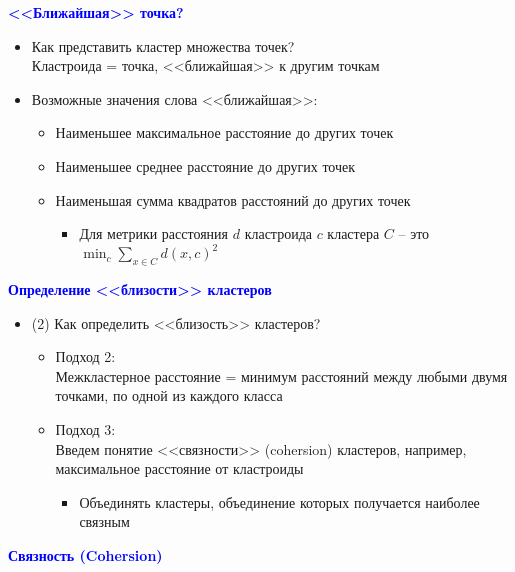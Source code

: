 \documentclass[landscape]{slides}
\begin{document}
\begin{normalsize}
\begin{slide}
\textbf{\textcolor{blue}{<<Ближайшая>> точка?}}

\begin{itemize}
\item Как представить кластер множества точек?\\
  Кластроида = точка, <<ближайшая>> к другим точкам
\item Возможные значения слова <<ближайшая>>:
  \begin{itemize}
  \item Наименьшее максимальное расстояние до других точек
  \item Наименьшее среднее расстояние до других точек
  \item Наименьшая сумма квадратов расстояний до других точек
    \begin{itemize}
    \item Для метрики расстояния $d$ кластроида $c$ кластера $C$ -- это
    $ \min_c \sum_{x\in C} d(x,c)^2$
    \end{itemize}
  \end{itemize}
\end{itemize}
\end{slide}



\begin{slide}
\textbf{\textcolor{blue}{Определение <<близости>> кластеров}}

\begin{itemize}
\item (2) Как определить <<близость>> кластеров?
  \begin{itemize}
  \item Подход 2:\\
  Межкластерное расстояние = минимум расстояний между любыми двумя точками, по одной из каждого класса
  \item Подход 3:\\
  Введем понятие <<связности>> (cohersion) кластеров, например,
  максимальное расстояние от кластроиды
    \begin{itemize}
    \item Объединять кластеры, объединение которых получается наиболее связным
    \end{itemize}
  \end{itemize}
\end{itemize}
\end{slide}



\begin{slide}
\textbf{\textcolor{blue}{Связность (Cohersion)}}


\end{slide}
\end{normalsize}
\end{document}
